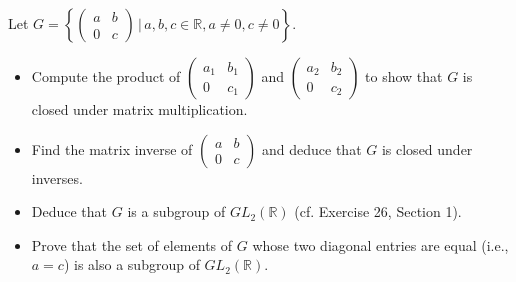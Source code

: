 \documentclass[12pt]{article}
\newenvironment{problem}[2][Exercise]{\begin{trivlist}
\item[\hskip \labelsep {\bfseries #1}\hskip \labelsep {\bfseries #2.}]}{\end{trivlist}}
\begin{document}
\begin{problem}{1.4.10}
Let $G=\left\{ \left(\begin{array}{cc} a & b \\ 0 & c \end{array}\right) \, | \, a,b,c\in\mathbb{R}, a\neq0, c\neq0\right\}$.
\begin{itemize}
    \item Compute the product of $\left(\begin{array}{cc} a_1 & b_1 \\ 0 & c_1\end{array}\right)$ and $\left(\begin{array}{cc} a_2 & b_2 \\ 0 & c_2 \end{array}\right)$ to show that $G$ is closed under matrix multiplication.
    \item Find the matrix inverse of $\left(\begin{array}{cc} a & b \\ 0 & c \end{array}\right)$ and deduce that $G$ is closed under inverses.
    \item Deduce that $G$ is a subgroup of $GL_2\left(\mathbb{R}\right)$ (cf. Exercise 26, Section 1).
    \item Prove that the set of elements of $G$ whose two diagonal entries are equal (i.e., $a=c$) is also a subgroup of $GL_2\left(\mathbb{R}\right)$.
\end{itemize}
\end{problem}
\end{document}
